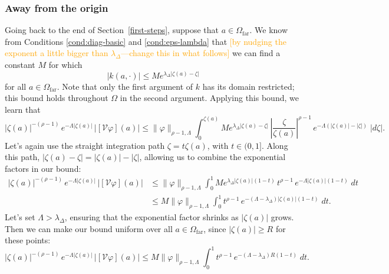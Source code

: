 \documentclass{article}
\theoremstyle{plain}
\newcommand{\volterra}{\mathcal{V}}
\newcommand{\domain}{\Omega}
\newcommand{\far}{\Omega_\text{far}}
\begin{document}
\subsubsection{Away from the origin}\label{far-bound}
Going back to the end of Section~\ref{first-steps}, suppose that $a \in \far$. We know from Conditions \eqref{cond:diag-basic} and \eqref{cond:eps-lambda} that \textcolor{orange}{[by nudging the exponent a little bigger than $\lambda_\Delta$---change this in what follows]} we can find a constant $M$ for which
\[ |k(a, \cdot)| \le M e^{\lambda_\Delta |\zeta(a) - \zeta|} \]
for all $a \in \far$. Note that only the first argument of $k$ has its domain restricted; this bound holds throughout $\domain$ in the second argument. Applying this bound, we learn that
\[ |\zeta(a)|^{-(\rho-1)}\,e^{-\Lambda|\zeta(a)|}\,|[\volterra\varphi](a)| \le \|\varphi\|_{\rho-1, \Lambda} \int_0^{\zeta(a)} M e^{\lambda_\Delta |\zeta(a) - \zeta|}\,\left|\frac{\zeta}{\zeta(a)}\right|^{\rho-1}\,e^{-\Lambda(|\zeta(a)| - |\zeta|)}\;|d\zeta|. \]
Let's again use the straight integration path $\zeta = t \zeta(a)$, with $t \in (0, 1]$. Along this path, $|\zeta(a) - \zeta| = |\zeta(a)| - |\zeta|$, allowing us to combine the exponential factors in our bound:
\begin{align*}
|\zeta(a)|^{-(\rho-1)}\,e^{-\Lambda|\zeta(a)|}\,|[\volterra\varphi](a)| & \le \|\varphi\|_{\rho-1, \Lambda} \int_0^1 M e^{\lambda_\Delta |\zeta(a)|(1 - t)}\,t^{\rho-1}\,e^{-\Lambda |\zeta(a)|(1 - t)}\;dt \\
& \le M \|\varphi\|_{\rho-1, \Lambda} \int_0^1 t^{\rho-1}\,e^{-(\Lambda - \lambda_\Delta)|\zeta(a)|(1 - t)}\;dt.
\end{align*}
Let's set $\Lambda > \lambda_\Delta$, ensuring that the exponential factor shrinks as $|\zeta(a)|$ grows. Then we can make our bound uniform over all $a \in \far$, since $|\zeta(a)| \ge R$ for these points:
\[ |\zeta(a)|^{-(\rho-1)}\,e^{-\Lambda|\zeta(a)|}\,|[\volterra\varphi](a)| \le M \|\varphi\|_{\rho-1, \Lambda} \int_0^1 t^{\rho-1}\,e^{-(\Lambda - \lambda_\Delta)R(1 - t)}\;dt. \]
\end{document}
